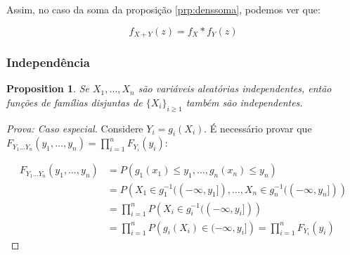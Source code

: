 \documentclass[
]{article}
\newtheorem{proposition}{Proposition}[section]
\theoremstyle{definition}
\theoremstyle{definition}
\theoremstyle{definition}
\theoremstyle{definition}
\theoremstyle{remark}
\begin{document}
Assim, no caso da soma da proposição \ref{prp:denssoma}, podemos ver que:

\begin{equation*}
f_{X+Y}(z) = f_{X}*f_{Y}(z)
\end{equation*}

\hypertarget{independuxeancia-1}{%
\subsubsection{Independência}\label{independuxeancia-1}}

\begin{proposition}
Se \(X_{1}, \ldots, X_{n}\) são variáveis aleatórias independentes, então funções de famílias disjuntas de \(\{X_{i}\}_{i \ge 1}\) também são independentes.
\end{proposition}

\begin{proof}[Prova: Caso especial]
Considere \(Y_{i} = g_{i}(X_{i})\). É necessário provar que \(F_{Y_{1} \ldots Y_{n}}(y_{1},\ldots,y_{n}) = \prod_{i=1}^{n}F_{Y_{i}}(y_{i})\):

\begin{align*}
F_{Y_{1} \ldots Y_{n}}(y_{1},\ldots,y_{n}) &= P(g_{1}(x_{1}) \le y_{1}, \ldots, g_{n}(x_{n}) \le y_{n}) \\
&= P\left(X_{1} \in g_{1}^{-1}((-\infty, y_{1}]),\ldots,X_{n} \in g_{n}^{-1}((-\infty, y_{n}])\right) \\
&= \prod_{i=1}^{n}P\left(X_{i} \in g_{i}^{-1}((-\infty,y_{i}])\right) \\
&= \prod_{i=1}^{n}P\left(g_{i}(X_{i}) \in (-\infty,y_{i}]\right) = \prod_{i=1}^{n}F_{Y_{i}}(y_{i})
\end{align*}
\end{proof}
\end{document}
